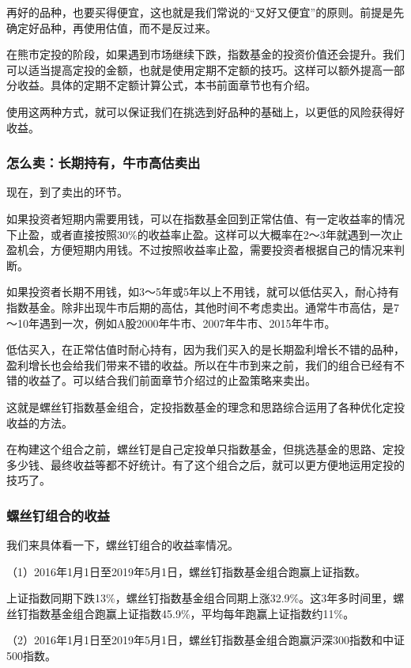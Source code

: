 再好的品种，也要买得便宜，这也就是我们常说的“又好又便宜”的原则。前提是先确定好品种，再使用估值，而不是反过来。

在熊市定投的阶段，如果遇到市场继续下跌，指数基金的投资价值还会提升。我们可以适当提高定投的金额，也就是使用定期不定额的技巧。这样可以额外提高一部分收益。具体的定期不定额计算公式，本书前面章节也有介绍。

使用这两种方式，就可以保证我们在挑选到好品种的基础上，以更低的风险获得好收益。

\subsubsection{怎么卖：长期持有，牛市高估卖出}

现在，到了卖出的环节。

如果投资者短期内需要用钱，可以在指数基金回到正常估值、有一定收益率的情况下止盈，或者直接按照30\%的收益率止盈。这样可以大概率在2～3年就遇到一次止盈机会，方便短期内用钱。不过按照收益率止盈，需要投资者根据自己的情况来判断。

如果投资者长期不用钱，如3～5年或5年以上不用钱，就可以低估买入，耐心持有指数基金。除非出现牛市后期的高估，其他时间不考虑卖出。通常牛市高估，是7～10年遇到一次，例如A股2000年牛市、2007年牛市、2015年牛市。

低估买入，在正常估值时耐心持有，因为我们买入的是长期盈利增长不错的品种，盈利增长也会给我们带来不错的收益。所以在牛市到来之前，我们的组合已经有不错的收益了。可以结合我们前面章节介绍过的止盈策略来卖出。

这就是螺丝钉指数基金组合，定投指数基金的理念和思路综合运用了各种优化定投收益的方法。

在构建这个组合之前，螺丝钉是自己定投单只指数基金，但挑选基金的思路、定投多少钱、最终收益等都不好统计。有了这个组合之后，就可以更方便地运用定投的技巧了。

\subsubsection{螺丝钉组合的收益}

我们来具体看一下，螺丝钉组合的收益率情况。

（1）2016年1月1日至2019年5月1日，螺丝钉指数基金组合跑赢上证指数。

上证指数同期下跌13\%，螺丝钉指数基金组合同期上涨32.9\%。这3年多时间里，螺丝钉指数基金组合跑赢上证指数45.9\%，平均每年跑赢上证指数约11\%。

（2）2016年1月1日至2019年5月1日，螺丝钉指数基金组合跑赢沪深300指数和中证500指数。

